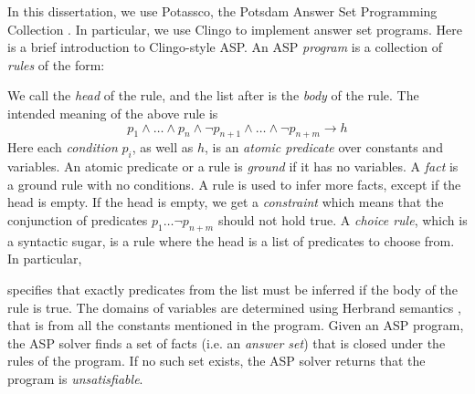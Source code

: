 In this dissertation, we use Potassco, the Potsdam Answer Set Programming Collection \cite{Potassco.2024}.
%
In particular, we use Clingo to implement answer set programs.
%
Here is a brief introduction to Clingo-style ASP.
%
An ASP \emph{program} is a collection of \emph{rules} of the form:
\begin{center}
\end{center}
%
We call  the \emph{head} of the rule, and the list after \clingo{:-} is the \emph{body} of the rule.
%
The intended meaning of the above rule is
$$ p_1 \land \dots \land p_n \land  \neg p_{n+1} \land \dots \land \neg p_{n+m} \rightarrow h $$
%
Here each \emph{condition} $p_i$, as well as $h$, is an \emph{atomic predicate} over constants and variables.
%
An atomic predicate or a rule is \emph{ground} if it has no variables.
%
A \emph{fact} is a ground rule with no conditions.
%
A rule is used to infer more facts, except if the head is empty.
%
If the head is empty, we get a \emph{constraint} which means that the conjunction of predicates $p_1 \ldots \neg p_{n+m}$ should not hold true.
%
A \emph{choice rule}, which is a syntactic sugar, is a rule where the head is a list of predicates to choose from.
%
In particular,
\begin{center}
\end{center}
specifies that exactly  predicates from the list  must be inferred if the body of the rule is true.
%
The domains of variables are determined using Herbrand semantics \cite{Herbrand.2019}, that is from all the constants mentioned in the program.
%
Given an ASP program, the ASP solver finds a set of facts (i.e. an \emph{answer set}) that is closed under the rules of the program.
%
If no such set exists, the ASP solver returns that the program is \emph{unsatisfiable}.
